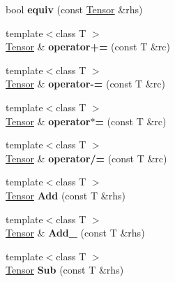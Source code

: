 \begin{DoxyCompactItemize}
\item 
\mbox{\label{classcytnx_1_1Tensor_aeae314f040e27b581d73c82b33ab6a59}} 
bool {\bfseries equiv} (const \hyperlink{classcytnx_1_1Tensor}{Tensor} \&rhs)
\item 
\mbox{\label{classcytnx_1_1Tensor_a14586eb5096b7c98465dc6081042922b}} 
{\footnotesize template$<$class T $>$ }\\\hyperlink{classcytnx_1_1Tensor}{Tensor} \& {\bfseries operator+=} (const T \&rc)
\item 
\mbox{\label{classcytnx_1_1Tensor_ab78b7d778d79c005ca5cc24385391075}} 
{\footnotesize template$<$class T $>$ }\\\hyperlink{classcytnx_1_1Tensor}{Tensor} \& {\bfseries operator-\/=} (const T \&rc)
\item 
\mbox{\label{classcytnx_1_1Tensor_a9ab679c8ccf4a9b8df95c3a622b98c2c}} 
{\footnotesize template$<$class T $>$ }\\\hyperlink{classcytnx_1_1Tensor}{Tensor} \& {\bfseries operator$\ast$=} (const T \&rc)
\item 
\mbox{\label{classcytnx_1_1Tensor_a7ba77e4d476866efbc330d48f1e6fbef}} 
{\footnotesize template$<$class T $>$ }\\\hyperlink{classcytnx_1_1Tensor}{Tensor} \& {\bfseries operator/=} (const T \&rc)
\item 
\mbox{\label{classcytnx_1_1Tensor_aafd7446e798d34427d4e6a9571861111}} 
{\footnotesize template$<$class T $>$ }\\\hyperlink{classcytnx_1_1Tensor}{Tensor} {\bfseries Add} (const T \&rhs)
\item 
\mbox{\label{classcytnx_1_1Tensor_ac7ab4b9ee38f619a60c26f203539db65}} 
{\footnotesize template$<$class T $>$ }\\\hyperlink{classcytnx_1_1Tensor}{Tensor} \& {\bfseries Add\+\_\+} (const T \&rhs)
\item 
\mbox{\label{classcytnx_1_1Tensor_a4648eef7874bad42d6d7b15fb1598644}} 
{\footnotesize template$<$class T $>$ }\\\hyperlink{classcytnx_1_1Tensor}{Tensor} {\bfseries Sub} (const T \&rhs)

\end{DoxyCompactItemize}
